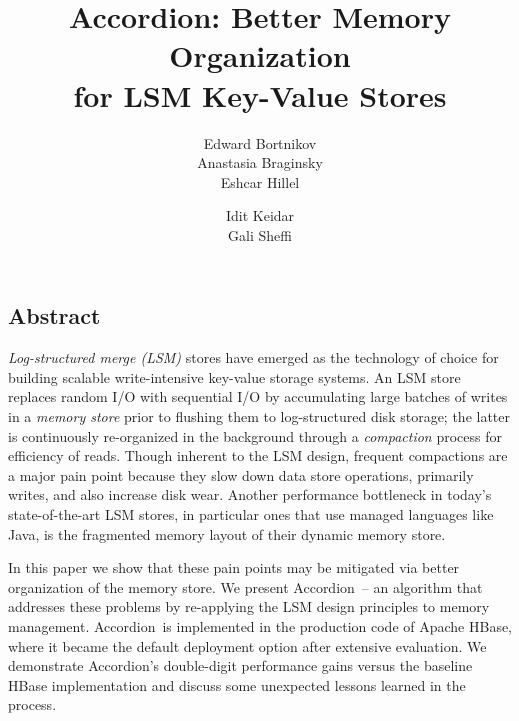 \documentclass{vldb}
\newcommand{\sys}{Accordion}
\begin{document}
\date{}

\title{\sys: Better Memory Organization\\ for LSM Key-Value Stores}

\author{
\alignauthor
Edward Bortnikov\\
       \email{}
\alignauthor       
Anastasia Braginsky\\
       \email{}
\alignauthor
Eshcar Hillel\\
       \email{}
       \and
\alignauthor
Idit Keidar\\
       \email{}       
\alignauthor
Gali Sheffi\\
       \email{}
} %

\maketitle




\subsection*{Abstract}

\emph{
Log-structured merge (LSM)} stores have emerged as the technology of choice for building scalable 
write-intensive key-value storage systems. An LSM store replaces random I/O with sequential 
I/O by accumulating large batches of writes in a \emph{memory store} prior to flushing them to log-structured 
disk storage; the latter is continuously re-organized in the background through a \emph{compaction}
process for efficiency of reads. Though inherent to the LSM design, frequent compactions are a major pain point 
because they slow down data store operations, primarily writes, and also increase disk wear. 
Another performance bottleneck in today's state-of-the-art LSM stores, in particular ones that use
managed languages like Java,  is the 
fragmented memory layout of their dynamic memory store.

In this paper we show 
that these pain points may be mitigated via better  organization of the memory store.
We present \sys\ -- an algorithm that addresses these problems by re-applying
the LSM design principles to memory management. 
\sys\ is implemented in the production code of Apache HBase, where it became the default deployment option 
after extensive evaluation. We demonstrate \sys's double-digit performance gains versus 
the baseline HBase implementation and discuss some unexpected lessons learned in the process. 
\end{document}
